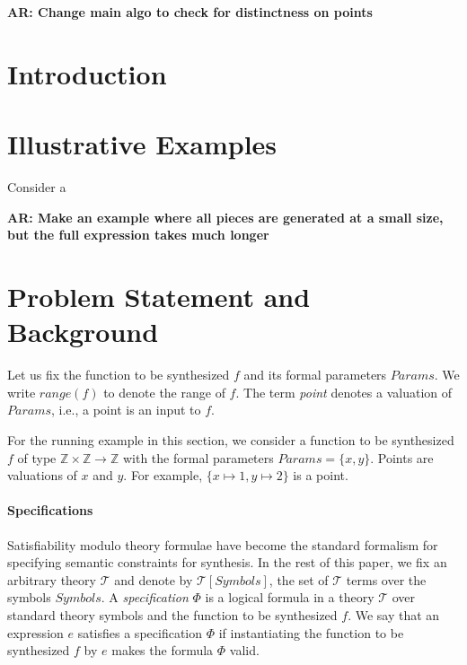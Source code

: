 \documentclass{llncs}
\newcommand\arsays[1]{{\bf AR: #1}}
\newcommand\Integers{\mathbb{Z}}
\newcommand\Expr{e}
\newcommand\Spec{\Phi}
\newcommand\SynthFun{f}
\newcommand\range{\mathit{range}}
\newcommand\FormalParameters{\mathit{Params}}
\newcommand\Symbols{\mathit{Symbols}}
\newcommand\Theory{\mathcal{T}}
\begin{document}
\arsays{Change main algo to check for distinctness on points}

\section{Introduction}
\label{sec:intro}

\section{Illustrative Examples}
\label{sec:example}

Consider a

\arsays{Make an example where all pieces are generated at a small size,
but the full expression takes much longer}


\section{Problem Statement and Background}
\label{sec:problem}

Let us fix the function to be synthesized $\SynthFun$ and its formal
parameters $\FormalParameters$.
We write $\range(\SynthFun)$ to denote the range of $\SynthFun$.
The term {\em point} denotes a valuation of $\FormalParameters$, i.e., a
point is an input to $\SynthFun$.

\begin{example}
  For the running example in this section, we consider a function to be
  synthesized $\SynthFun$ of type $\Integers \times \Integers \to
  \Integers$ with the formal parameters $\FormalParameters = \{ x, y \}$.
  Points are valuations of $x$ and $y$.
  For example, $\{ x \mapsto 1, y \mapsto 2 \}$ is a point.
\end{example}

\paragraph{Specifications}
Satisfiability modulo theory formulae have become the standard formalism
for specifying semantic constraints for synthesis.
In the rest of this paper, we fix an arbitrary theory $\Theory$ and
denote by $\Theory[\Symbols]$, the set of $\Theory$ terms over the
symbols $\Symbols$.
A {\em specification} $\Spec$ is a logical formula in a theory $\Theory$
over standard theory symbols and the function to be synthesized
$\SynthFun$.
We say that an expression $\Expr$ satisfies a specification $\Spec$ if
instantiating the function to be synthesized $\SynthFun$ by $\Expr$
makes the formula $\Spec$ valid.
\end{document}
